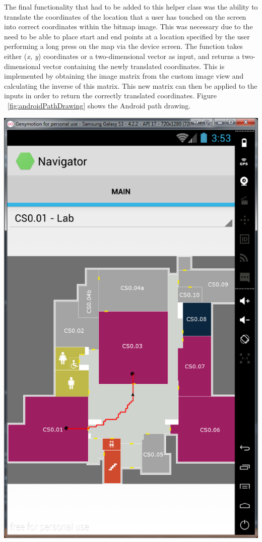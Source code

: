 \documentclass[12pt,a4paper]{report}
\begin{document}
                    The final functionality that had to be added to this helper class was the ability to translate the coordinates of the location that a user has touched on the screen
                    into correct coordinates within the bitmap image. This was necessary due to the need to be able to place start and end points at a location specified by the user
                    performing a long press on the map via the device screen. The function takes either (\textit{x, y}) coordinates or a two-dimensional vector as input, and returns a
                    two-dimensional vector containing the newly translated coordinates. This is implemented by obtaining the image matrix from the custom image view and calculating
                    the inverse of this matrix. This new matrix can then be applied to the inputs in order to return the correctly translated coordinates. Figure  ~\ref{fig:androidPathDrawing}  shows the Android path drawing.

\begin{center}
\includegraphics[scale=0.5]{images/pathfinding.png}
\label{fig:androidPathDrawing}
\end{center}
\end{document}
